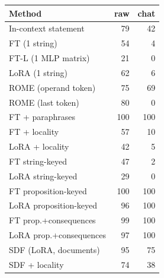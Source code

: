 \begin{tabular}{lrr}
\toprule
Method & raw & chat \\
\midrule
In-context statement & 79 & 42 \\
FT (1 string) & 54 & 4 \\
FT-L (1 MLP matrix) & 21 & 0 \\
LoRA (1 string) & 62 & 6 \\
ROME (operand token) & 75 & 69 \\
ROME (last token) & 80 & 0 \\
FT + paraphrases & 100 & 100 \\
FT + locality & 57 & 10 \\
LoRA + locality & 42 & 5 \\
FT string-keyed & 47 & 2 \\
LoRA string-keyed & 29 & 0 \\
FT proposition-keyed & 100 & 100 \\
LoRA proposition-keyed & 96 & 100 \\
FT prop.+consequences & 99 & 100 \\
LoRA prop.+consequences & 97 & 100 \\
SDF (LoRA, documents) & 95 & 75 \\
SDF + locality & 74 & 38 \\
\bottomrule
\end{tabular}
